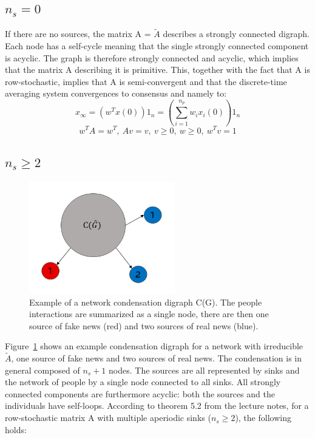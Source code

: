 \subsection{$n_s = 0$}
If there are no sources, the matrix A = $\tilde{A}$ describes a strongly connected digraph. Each node has a self-cycle meaning that the single strongly connected component is acyclic. The graph is therefore strongly connected and acyclic, which implies that the matrix A describing it is primitive. This, together with the fact that A is row-stochastic, implies that A is semi-convergent and that the discrete-time averaging system convergences to consensus and namely to:
$$
x_{\infty} = (w^Tx(0))1_n = \left(\sum_{i=1}^{n_p}w_ix_i(0)\right)1_n
$$
$$
w^TA = w^T,\ 
Av = v,\ 
v \geq 0,\ w \geq 0,\ w^Tv = 1
$$
\subsection{$n_s \geq 2$}
\begin{figure}[!t]
	\centering
	\includegraphics[width=2.5in]{Figures/condensation_digraph.png}
	\caption{Example of a network condensation digraph C(G). The people interactions are summarized as a single node, there are then one source of fake news (red) and two sources of real news (blue).}
	\label{pics:condensation_digraph_example}
\end{figure}
Figure~\ref{pics:condensation_digraph_example} shows an example condensation digraph for a network with irreducible $\tilde{A}$, one source of fake news and two sources of real news. The condensation is in general composed of $n_s+1$ nodes. The sources are all represented by sinks and the network of people by a single node connected to all sinks. \newline
All strongly connected components are furthermore acyclic: both the sources and the individuals have self-loops.
According to theorem 5.2 from the lecture notes, for a row-stochastic matrix A with multiple aperiodic sinks ($n_s \geq 2$), the following holds:
